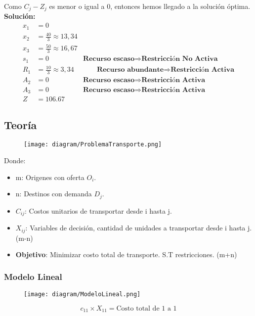 \documentclass{templateNote}
\begin{document}
Como $C_j - Z_j$ es menor o igual a 0, entonces hemos llegado a la solución óptima.
\textbf{Solución:}
\begin{align*}
    x_1 &= 0 \\
    x_2 &= \displaystyle\frac{40}{3} \approx 13,34 \\
    x_3 &= \displaystyle\frac{50}{3} \approx 16,67 \\
    s_1 &= 0 \qquad &\textbf{Recurso escaso} \Rightarrow \textbf{Restricción No Activa}\\
    R_1 &= \displaystyle\frac{10}{3} \approx 3,34 &\qquad \textbf{Recurso abundante} \Rightarrow \textbf{Restricción Activa}\\
    A_2 &= 0 \qquad &\textbf{Recurso escaso} \Rightarrow \textbf{Restricción Activa}\\
    A_3 &= 0 \qquad &\textbf{Recurso escaso} \Rightarrow \textbf{Restricción Activa}\\
    Z &= 106.67
\end{align*}

\newpage
\subsection*{Teoría}
\begin{figure}[H]
    \centering
    \texttt{[image: diagram/ProblemaTransporte.png]}
\end{figure}
Donde:
\begin{itemize}
    \item m: Origenes con oferta $O_i$.
    \item n: Destinos con demanda $D_j$.
    \item $C_{ij}$: Costos unitarios de transportar desde i hasta j.
    \item $X_{ij}$: Variables de decisión, cantidad de unidades a transportar desde i hasta j. \textcolor{red!50}{(m-n)}
    \item \textbf{Objetivo}: Minimizar costo total de transporte. S.T restricciones. \textcolor{blue!50}{(m+n)} 
\end{itemize}

\subsubsection*{Modelo Lineal}

\begin{figure}[H]
    \centering
    \texttt{[image: diagram/ModeloLineal.png]}
\end{figure}
\begin{equation*}
    c_{11} \times X_{11} = \text{Costo total de 1 a 1}
\end{equation*}
\end{document}
